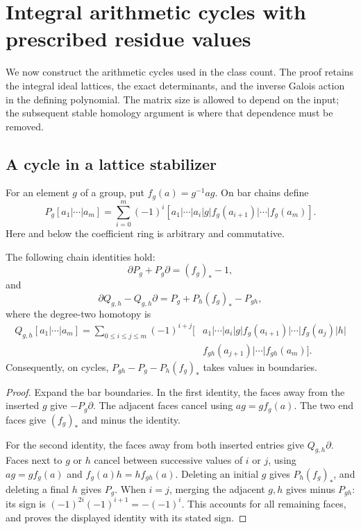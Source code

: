 \section{Integral arithmetic cycles with prescribed residue values}
\label{sa-section}

We now construct the arithmetic cycles used in the class
count.\cite{alpo-uniform-source}
The proof retains the integral ideal lattices, the exact
determinants, and the inverse Galois action in the defining
polynomial.  The matrix size is allowed to depend on the
input; the subsequent stable homology argument is where
that dependence must be removed.

\subsection{A cycle in a lattice stabilizer}

For an element \(g\) of a group, put
\(f_g(a)=g^{-1}ag\).  On bar chains define
\[
 P_g[a_1|\cdots|a_m]
  =\sum_{i=0}^m(-1)^i
    [a_1|\cdots|a_i|g|f_g(a_{i+1})|\cdots|f_g(a_m)].
\]
Here and below the coefficient ring is arbitrary and
commutative.

\begin{lemma}\label{sa-prisms}
The following chain identities hold:
\[
       \partial P_g+P_g\partial=(f_g)_*-1,
\]
and
\[
       \partial Q_{g,h}-Q_{g,h}\partial
                 =P_g+P_h(f_g)_*-P_{gh},
\]
where the degree-two homotopy is
\begin{align*}
 Q_{g,h}[a_1|\cdots|a_m]
   =\sum_{0\le i\le j\le m}(-1)^{i+j}
   [&a_1|\cdots|a_i|g|
       f_g(a_{i+1})|\cdots|f_g(a_j)|h|\\
    &f_{gh}(a_{j+1})|\cdots|f_{gh}(a_m)].
\end{align*}
Consequently, on cycles,
\(P_{gh}-P_g-P_h(f_g)_*\) takes values in boundaries.
\end{lemma}
\begin{proof}
Expand the bar boundaries.  In the first identity,
the faces away from the inserted \(g\) give
\(-P_g\partial\).  The adjacent faces cancel using
\(a g=g f_g(a)\).  The two end faces give
\((f_g)_*\) and minus the identity.

For the second identity, the faces away from both
inserted entries give \(Q_{g,h}\partial\).
Faces next to \(g\) or \(h\) cancel between successive
values of \(i\) or \(j\), using
\(a g=g f_g(a)\) and
\(f_g(a)h=h f_{gh}(a)\).
Deleting an initial \(g\) gives \(P_h(f_g)_*\),
and deleting a final \(h\) gives \(P_g\).
When \(i=j\), merging the adjacent \(g,h\) gives
minus \(P_{gh}\): its sign is
\((-1)^{2i}(-1)^{i+1}=-(-1)^i\).
This accounts for all remaining faces, and proves
the displayed identity with its stated sign.
\end{proof}

